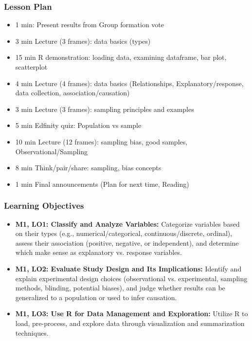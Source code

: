 \begin{frame}
    \frametitle{Lesson Plan}
    \begin{itemize}
        \item 1 min: Present results from Group formation vote
        \item 3 min Lecture (3 frames): data basics (types)
        \item 15 min R demonstration: loading data, examining dataframe, bar plot, scatterplot
        \item 4 min Lecture (4 frames): data basics (Relationships, Explanatory/response, data collection, association/causation)
        \item 3 min Lecture (3 frames): sampling principles and examples
        \item 5 min Edfinity quiz: Population vs sample
        \item 10 min Lecture (12 frames): sampling bias, good samples, Observational/Sampling
        \item 8 min Think/pair/share: sampling, bias concepts
        \item 1 min Final announcements (Plan for next time, Reading)
    \end{itemize}
\end{frame}
    
\begin{frame}
    \frametitle{Learning Objectives}
    \begin{itemize}
        \item \textbf{M1, LO1: Classify and Analyze Variables:} Categorize variables based on their types (e.g., numerical/categorical, continuous/discrete, ordinal), assess their association (positive, negative, or independent), and determine which make sense as explanatory vs. response variables.
        \item \textbf{M1, LO2: Evaluate Study Design and Its Implications:} Identify and explain experimental design choices (observational vs. experimental, sampling methods, blinding, potential biases), and judge whether results can be generalized to a population or used to infer causation. 
        \item \textbf{M1, LO3: Use R for Data Management and Exploration:} Utilize R to load, pre-process, and explore data through visualization and summarization techniques.
    \end{itemize}
\end{frame}

